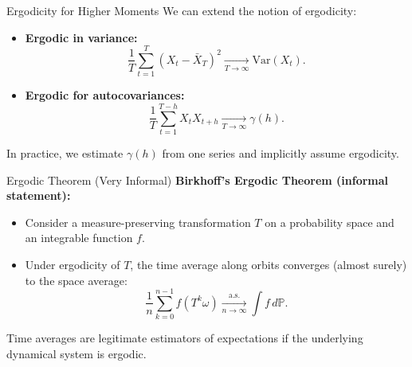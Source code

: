 \documentclass{beamer}
\begin{document}
\begin{frame}{Ergodicity for Higher Moments}
  We can extend the notion of ergodicity:
  \begin{itemize}
    \item \textbf{Ergodic in variance:}
      \[
        \frac{1}{T}\sum_{t=1}^T (X_t - \bar{X}_T)^2
        \xrightarrow[T \to \infty]{}
        \mathrm{Var}(X_t).
      \]
    \item \textbf{Ergodic for autocovariances:}
      \[
        \frac{1}{T}\sum_{t=1}^{T-h} X_t X_{t+h}
        \xrightarrow[T \to \infty]{}
        \gamma(h).
      \]
  \end{itemize}

  \vspace{0.3cm}
  In practice, we estimate $\gamma(h)$ from one series and implicitly assume ergodicity.
\end{frame}

\begin{frame}{Ergodic Theorem (Very Informal)}
  \textbf{Birkhoff's Ergodic Theorem (informal statement):}
  \begin{itemize}
    \item Consider a measure-preserving transformation $T$ on a probability space and an integrable function $f$.
    \item Under ergodicity of $T$, the time average along orbits converges (almost surely) to the space average:
      \[
        \frac{1}{n}\sum_{k=0}^{n-1} f(T^k \omega)
        \xrightarrow[n\to\infty]{\text{a.s.}}
        \int f \, d\mathbb{P}.
      \]
  \end{itemize}

  \vspace{0.3cm}
  Time averages are legitimate estimators of expectations if the underlying dynamical system is ergodic.
\end{frame}
\end{document}
